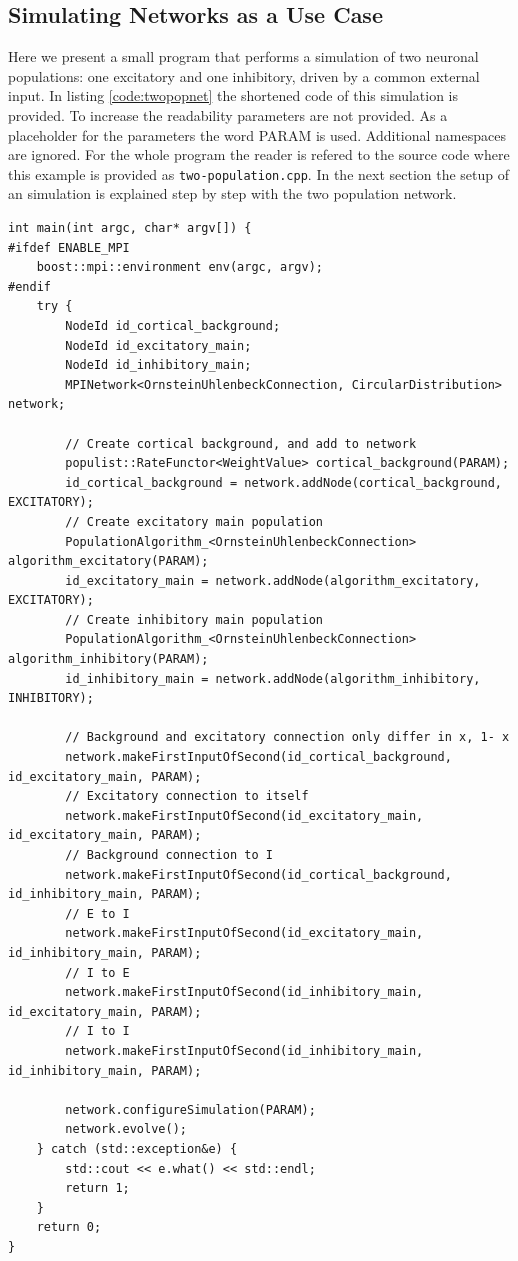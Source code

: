 \documentclass[12pt]{article}
\begin{document}
\subsection{Simulating Networks as a Use Case}
Here we present a small program that performs a simulation of two neuronal populations: one excitatory and one inhibitory, driven by a common external input.
In listing \ref{code:twopopnet} the shortened code of this simulation is provided.
To increase the readability parameters are not provided. 
As a placeholder for the parameters the word PARAM is used.
Additional namespaces are ignored. 
For the whole program the reader is refered to the source code where this example is provided as \texttt{two-population.cpp}.
In the next section the setup of an simulation is explained step by step with the two population network.
\begin{lstlisting}[caption=Simulation of a two neuronal population network.,label=code:twopopnet]
int main(int argc, char* argv[]) {
#ifdef ENABLE_MPI
	boost::mpi::environment env(argc, argv);
#endif
	try {
		NodeId id_cortical_background;
		NodeId id_excitatory_main;
		NodeId id_inhibitory_main;
		MPINetwork<OrnsteinUhlenbeckConnection, CircularDistribution> network;

		// Create cortical background, and add to network
		populist::RateFunctor<WeightValue> cortical_background(PARAM);
		id_cortical_background = network.addNode(cortical_background, EXCITATORY);
		// Create excitatory main population
		PopulationAlgorithm_<OrnsteinUhlenbeckConnection> algorithm_excitatory(PARAM);
		id_excitatory_main = network.addNode(algorithm_excitatory, EXCITATORY);
		// Create inhibitory main population
		PopulationAlgorithm_<OrnsteinUhlenbeckConnection>  algorithm_inhibitory(PARAM);
		id_inhibitory_main = network.addNode(algorithm_inhibitory, INHIBITORY);

		// Background and excitatory connection only differ in x, 1- x
		network.makeFirstInputOfSecond(id_cortical_background, id_excitatory_main, PARAM);
		// Excitatory connection to itself
		network.makeFirstInputOfSecond(id_excitatory_main, id_excitatory_main, PARAM);
		// Background connection to I
		network.makeFirstInputOfSecond(id_cortical_background, id_inhibitory_main, PARAM);
		// E to I
		network.makeFirstInputOfSecond(id_excitatory_main, id_inhibitory_main, PARAM);
		// I to E
		network.makeFirstInputOfSecond(id_inhibitory_main, id_excitatory_main, PARAM);
		// I to I
		network.makeFirstInputOfSecond(id_inhibitory_main, id_inhibitory_main, PARAM);
		
		network.configureSimulation(PARAM);
		network.evolve();
	} catch (std::exception&e) {
		std::cout << e.what() << std::endl;
		return 1;
	}
	return 0;
}
\end{lstlisting}
\end{document}

